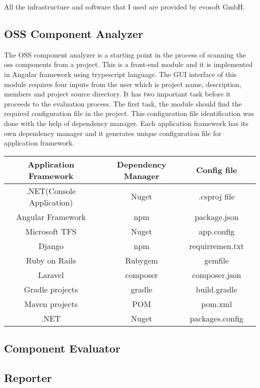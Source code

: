 All the infrastructure and software that I used are provided by evosoft GmbH.
\subsection{OSS Component Analyzer}
The OSS component analyzer is a starting point in the process of scanning the oss components from a project. This is a front-end module and it is implemented in Angular framework using trypescript language. The GUI interface of this module requires four inputs from the user which is project name, description, members and project source directory. It has two important task before it proceeds to the evaluation process. The first task, the module should find the required configuration file in the project. This configuration file identification was done with the help of dependency manager. Each application framework has its own dependency manager and it generates unique configuration file for application framework.
\begin{center}
 \begin{tabular}{ |c|c|c|c| } 
 	\hline
 	Application Framework & Dependency Manager & Config file \\
 	\hline
 	.NET(Console Application) & Nuget & .csproj file \\ 
 	Angular Framework & npm & package.json \\ 
 	Microsoft TFS & Nuget & app.config \\ 
 	Django & npm & requirremen.txt \\ 
 	Ruby on Rails & Rubygem & gemfile \\ 
 	Laravel & composer & composer.json \\ 
 	Gradle projects & gradle & build.gradle \\ 
 	Maven projects & POM & pom.xml \\ 
 	.NET  & Nuget &packages.config \\ 
 	\hline
 \end{tabular}
\end{center} 
\subsection{Component Evaluator}

\subsection{Reporter}
%
